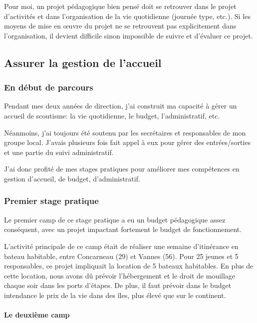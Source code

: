 \documentclass[titlepage,11pt,a4paper]{article}
\begin{document}
Pour moi, un projet pédagogique bien pensé doit se retrouver dans le projet d'activités et
dans l'organisation de la vie quotidienne (journée type, etc.). Si les moyens de mise en
œuvre du projet ne se retrouvent pas explicitement dans l'organisation, il devient
difficile sinon impossible de suivre et d'évaluer ce projet.

\subsection{Assurer la gestion de l'accueil}

\subsubsection{En début de parcours}

Pendant mes deux années de direction, j'ai construit ma capacité à gérer un accueil de
scoutisme: la vie quotidienne, le budget, l'administratif, etc.

Néanmoins, j'ai toujours été soutenu par les secrétaires et responsables de mon groupe
local. J'avais plusieurs fois fait appel à eux pour gérer des entrées/sorties et une
partie du suivi administratif.

J'ai donc profité de mes stages pratiques pour améliorer mes compétences en gestion
d'accueil, de budget, d'administratif.

\subsubsection{Premier stage pratique}

Le premier camp de ce stage pratique a eu un budget pédagogique assez conséquent, avec un
projet impactant fortement le budget de fonctionnement.

L'activité principale de ce camp était de réaliser une semaine d’itinérance en bateau
habitable, entre Concarneau (29) et Vannes (56). Pour 25 jeunes et 5 responsables, ce
projet impliquait la location de 5 bateaux habitables. En plus de cette location, nous
avons dû prévoir l'hébergement et le droit de mouillage chaque soir dans les ports d'étapes.
De plus, il faut prévoir dans le budget intendance le prix de la vie dans des
îles, plus élevé que sur le continent. %

\paragraph{Le deuxième camp}
\end{document}
